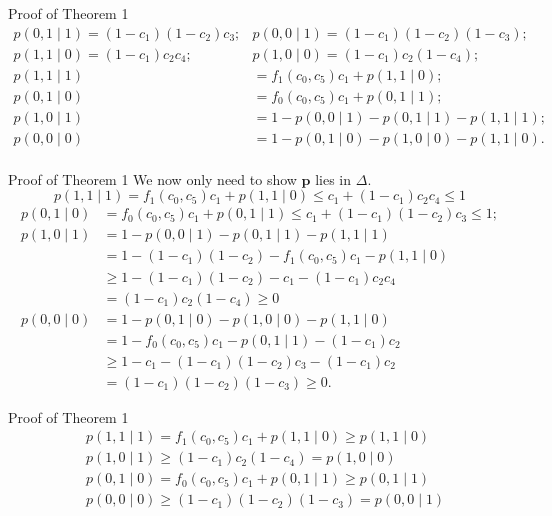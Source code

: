\documentclass[aspectratio=169,xcolor=dvipsnames]{beamer}
\begin{document}
\begin{frame}{Proof of Theorem 1}
$$
\begin{aligned}
p(0,1 \mid 1)=\left(1-c_{1}\right)\left(1-c_{2}\right) c_{3} ; & p(0,0 \mid 1)=\left(1-c_{1}\right)\left(1-c_{2}\right)\left(1-c_{3}\right) ; \\
p(1,1 \mid 0)=\left(1-c_{1}\right) c_{2} c_{4} ; & p(1,0 \mid 0)=\left(1-c_{1}\right) c_{2}\left(1-c_{4}\right) ;\\
p(1,1 \mid 1)&=f_{1}\left(c_{0}, c_{5}\right) c_{1}+p(1,1 \mid 0);\\
p(0,1 \mid 0)&=f_{0}\left(c_{0}, c_{5}\right) c_{1}+p(0,1 \mid 1);\\
p(1,0 \mid 1)&=1-p(0,0 \mid 1)-p(0,1 \mid 1)-p(1,1 \mid 1);\\
p(0,0 \mid 0)&=1-p(0,1 \mid 0)-p(1,0 \mid 0)-p(1,1 \mid 0).\\
\end{aligned}
$$
\end{frame}

\begin{frame}{Proof of Theorem 1}
We now only need to show $\boldsymbol{p}$ lies in $\Delta$. 
$$
p(1,1 \mid 1)=f_{1}\left(c_{0}, c_{5}\right) c_{1}+p(1,1 \mid 0) \leq c_{1}+\left(1-c_{1}\right) c_{2} c_{4} \leq 1
$$
$$
\begin{aligned}
p(0,1 \mid 0) &=f_{0}\left(c_{0}, c_{5}\right) c_{1}+p(0,1 \mid 1) \leq c_{1}+\left(1-c_{1}\right)\left(1-c_{2}\right) c_{3} \leq 1 ; \\
p(1,0 \mid 1) &=1-p(0,0 \mid 1)-p(0,1 \mid 1)-p(1,1 \mid 1) \\
&=1-\left(1-c_{1}\right)\left(1-c_{2}\right)-f_{1}\left(c_{0}, c_{5}\right) c_{1}-p(1,1 \mid 0) \\
& \geq 1-\left(1-c_{1}\right)\left(1-c_{2}\right)-c_{1}-\left(1-c_{1}\right) c_{2} c_{4} \\
&=\left(1-c_{1}\right) c_{2}\left(1-c_{4}\right) \geq 0 \\
p(0,0 \mid 0) &=1-p(0,1 \mid 0)-p(1,0 \mid 0)-p(1,1 \mid 0) \\
&=1-f_{0}\left(c_{0}, c_{5}\right) c_{1}-p(0,1 \mid 1)-\left(1-c_{1}\right) c_{2} \\
& \geq 1-c_{1}-\left(1-c_{1}\right)\left(1-c_{2}\right) c_{3}-\left(1-c_{1}\right) c_{2} \\
&=\left(1-c_{1}\right)\left(1-c_{2}\right)\left(1-c_{3}\right) \geq 0 .
\end{aligned}
$$
\end{frame}

\begin{frame}{Proof of Theorem 1}
$$
\begin{aligned}
&p(1,1 \mid 1)=f_{1}\left(c_{0}, c_{5}\right) c_{1}+p(1,1 \mid 0) \geq p(1,1 \mid 0) \\
&p(1,0 \mid 1) \geq\left(1-c_{1}\right) c_{2}\left(1-c_{4}\right)=p(1,0 \mid 0) \\
&p(0,1 \mid 0)=f_{0}\left(c_{0}, c_{5}\right) c_{1}+p(0,1 \mid 1) \geq p(0,1 \mid 1) \\
&p(0,0 \mid 0) \geq\left(1-c_{1}\right)\left(1-c_{2}\right)\left(1-c_{3}\right)=p(0,0 \mid 1)
\end{aligned}
$$
\end{frame}
\end{document}
